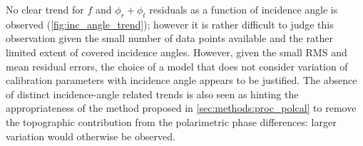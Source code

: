 No clear trend for $f$ and $\phi_r + \phi_t$ residuals as a function of incidence angle is observed (\autoref{fig:inc_angle_trend}); however it is rather difficult to judge this observation given the small number of data points available and the rather limited extent of covered incidence angles. However, given the small RMS and mean residual errors, the choice of a model that does not consider variation of calibration parameters with incidence angle appears to be justified. The absence of distinct incidence-angle related trends is also seen as hinting the appropriateness of the method proposed in \autoref{sec:methods:proc_polcal} to remove the topographic contribution from the polarimetric phase differences: larger variation would otherwise be observed.\\
